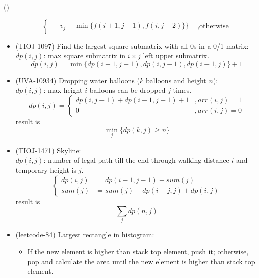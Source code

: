 \begin{theorem}{()}
\begin{itemize}
\begin{equation}
\begin{cases}
\begin{aligned}
                    & v_j + \min\{f(i + 1, j -1), f(i, j - 2)\}\}
                \end{aligned} &, \text{otherwise}
            \end{cases}
        \end{equation}
        \item (TIOJ-1097) Find the largest square submatrix with all 0s in a 0/1 matrix: \\ 
        $dp(i, j)$: max square submatrix in $i \times j$ left upper submatrix. \begin{equation}
            dp(i, j) = \min\{dp(i − 1, j − 1), dp(i, j − 1), dp(i − 1,j)\} + 1
        \end{equation} 
        \item (UVA-10934) Dropping water balloons ($k$ balloons and height $n$): \\ 
        $dp(i, j)$: max height $i$ balloons can be dropped $j$ times. \begin{equation}
            dp(i, j) = \begin{cases}
                dp(i, j - 1) + dp(i - 1, j - 1) + 1 &, arr(i, j) = 1 \\
                0 &, arr(i, j) = 0
            \end{cases}
        \end{equation} result is \begin{equation}
            \min_{j} \{dp(k, j) \ge n\}
        \end{equation}
        \item (TIOJ-1471) Skyline: \\ 
        $dp(i, j)$: number of legal path till the end through walking distance $i$ and temporary height is $j$. \begin{equation}
            \begin{cases}
                dp(i, j) & = dp(i - 1, j - 1) + sum(j) \\
                sum(j) & = sum(j) - dp(i - j, j) + dp(i, j)
            \end{cases}
        \end{equation} result is \begin{equation}
            \sum_{j}dp(n, j)
        \end{equation}
        \item (leetcode-84) Largest rectangle in histogram: \begin{itemize}
            \item If the new element is higher than stack top element, push it; otherwise, pop and calculate the area until the new element is higher than stack top element.

\end{itemize}
\end{itemize}
\end{theorem}
